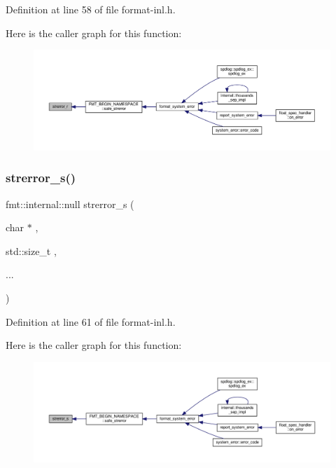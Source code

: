 Definition at line 58 of file format-\/inl.\+h.

Here is the caller graph for this function\+:
\nopagebreak
\begin{figure}[H]
\begin{center}
\leavevmode
\includegraphics[width=350pt]{format-inl_8h_a8307cb500850a7c5033cf64702e15990_icgraph}
\end{center}
\end{figure}
\mbox{\label{format-inl_8h_a3bbfb7ce6b764966d8cf5d018589375e}} 
\subsubsection{\texorpdfstring{strerror\+\_\+s()}{strerror\_s()}}
{\footnotesize\ttfamily fmt\+::internal\+::null strerror\+\_\+s (\begin{DoxyParamCaption}\item[{char $\ast$}]{,  }\item[{std\+::size\+\_\+t}]{,  }\item[{}]{... }\end{DoxyParamCaption})\hspace{0.3cm}{\ttfamily [inline]}}



Definition at line 61 of file format-\/inl.\+h.

Here is the caller graph for this function\+:
\nopagebreak
\begin{figure}[H]
\begin{center}
\leavevmode
\includegraphics[width=350pt]{format-inl_8h_a3bbfb7ce6b764966d8cf5d018589375e_icgraph}
\end{center}
\end{figure}
\mbox{\label{format-inl_8h_a9d834f6ef5c0553b6c434f8d9ac105bf}} 
